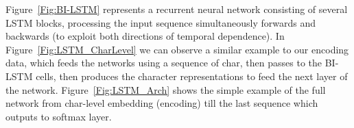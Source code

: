 Figure~\ref{Fig:BI-LSTM} represents a recurrent neural network consisting of several LSTM blocks, processing the input sequence simultaneously forwards and backwards (to exploit both directions of temporal dependence). In Figure~\ref{Fig:LSTM_CharLevel} we can observe a similar example to our encoding data, which feeds the networks using a sequence of char, then passes to the BI-LSTM cells, then produces the character representations to feed the next layer of the network. Figure~\ref{Fig:LSTM_Arch} shows the simple example of the full network from char-level embedding (encoding) till the last sequence which outputs to softmax layer.%
\begin{figure}[!t]
 \centering
\end{figure}%


